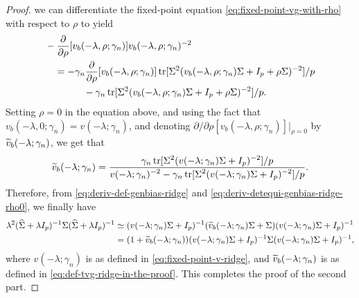 \documentclass{article}
\begin{document}
\begin{proof}
    we can differentiate the fixed-point equation \eqref{eq:fixed-point-vg-with-rho}
    with respect to $\rho$ to yield
    \begin{equation*}
    \begin{split}
        &-
        \frac{\partial}{\partial \rho}
        [v_b(-\lambda, \rho; \gamma_n)] 
        v_b(-\lambda, \rho; \gamma_n)^{-2} \\
        &\quad = 
        - \gamma_n 
        \frac{\partial}{\partial \rho}[v_b(-\lambda, \rho; \gamma_n)]
        \operatorname{tr}[\Sigma^2 (v_b(-\lambda, \rho; \gamma_n) \Sigma + I_p + \rho \Sigma)^{-2}] / p \\
        &\qquad \qquad - \gamma_n
        \operatorname{tr}[\Sigma^2 (v_b(-\lambda, \rho; \gamma_n) \Sigma + I_p + \rho \Sigma)^{-2}] / p.
    \end{split}
    \end{equation*}
    Setting $\rho = 0$ in the equation above,
    and using the fact that $v_b(-\lambda, 0; \gamma_n) = v(-\lambda; \gamma_n)$,
    and denoting 
    $\partial / \partial \rho[v_b(-\lambda, \rho; \gamma_n)] |_{\rho = 0}$
    by $\widetilde{v}_b(-\lambda; \gamma_n)$,
    we get that
    \begin{equation}
        \label{eq:def-tvg-ridge-in-the-proof}
        \widetilde{v}_b(-\lambda; \gamma_n)
        = 
        \frac{\displaystyle \gamma_n \operatorname{tr}[\Sigma^2 (v(-\lambda; \gamma_n) \Sigma + I_p)^{-2}] / p}{\displaystyle v(-\lambda; \gamma_n)^{-2} - \gamma_n \operatorname{tr}[\Sigma^2 (v(-\lambda; \gamma_n) \Sigma + I_p)^{-2}] / p}.
    \end{equation}
    Therefore, from \eqref{eq:deriv-def-genbias-ridge} 
    and \eqref{eq:deriv-detequi-genbias-ridge-rho0},
    we finally have
   \begin{align*}
        \lambda^2
        ({\widehat{\Sigma}} + \lambda I_p)^{-1}
        \Sigma
        ({\widehat{\Sigma}} + \lambda I_p)^{-1}
        &\simeq
        (v(-\lambda; \gamma_n) \Sigma + I_p)^{-1}
        (\widetilde{v}_b(-\lambda; \gamma_n) \Sigma + \Sigma)
        (v(-\lambda; \gamma_n) \Sigma + I_p)^{-1} \\
        &=
        (1 + \widetilde{v}_b(-\lambda; \gamma_n))
        (v(-\lambda; \gamma_n) \Sigma + I_p)^{-1}
        \Sigma
        (v(-\lambda; \gamma_n) \Sigma + I_p)^{-1},
   \end{align*}
   where $v(-\lambda; \gamma_n)$ is as defined in \eqref{eq:fixed-point-v-ridge},
   and $\widetilde{v}_b(-\lambda; \gamma_n)$ is as defined in \eqref{eq:def-tvg-ridge-in-the-proof}.
   This completes the proof of the second part.
\end{proof}
\end{document}
